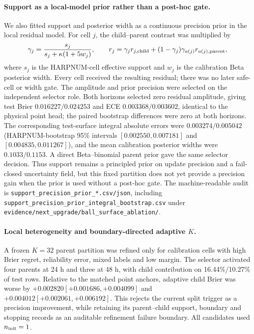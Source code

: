 \documentclass[11pt,a4paper]{article}
\numberwithin{equation}{section}
\theoremstyle{definition}\newtheorem{definition}[theorem]{Definition}
\theoremstyle{remark}\newtheorem{remark}[theorem]{Remark}
\begin{document}
\paragraph{Support as a local-model prior rather than a post-hoc gate.}
We also fitted support and posterior width as a continuous precision prior in the local residual model. For cell $j$, the child--parent contrast was multiplied by
\[
\gamma_j={s_j\over s_j+\kappa(1+5w_j)},
\qquad
r_j=\gamma_j r_{j,\mathrm{child}}+(1-\gamma_j)\gamma_{a(j)}r_{a(j),\mathrm{parent}},
\]
where $s_j$ is the HARPNUM-cell effective support and $w_j$ is the calibration Beta posterior width. Every cell received the resulting residual; there was no later safe-cell or width gate. The amplitude and prior precision were selected on the independent selector role. Both horizons selected zero residual amplitude, giving test Brier $0.016227/0.024253$ and ECE $0.003368/0.003602$, identical to the physical point head; the paired bootstrap differences were zero at both horizons. The corresponding test-surface integral absolute errors were $0.003274/0.005042$ (HARPNUM-bootstrap 95\% intervals $[0.002550,0.007181]$ and $[0.004835,0.011267]$), and the mean calibration posterior widths were $0.1033/0.1153$. A direct Beta--binomial parent prior gave the same selector decision. Thus support remains a principled prior on update precision and a fail-closed uncertainty field, but this fixed partition does not yet provide a precision gain when the prior is used without a post-hoc gate. The machine-readable audit is \texttt{support\_precision\_prior\_*.csv/json}, including \texttt{support\_precision\_prior\_integral\_bootstrap.csv} under \texttt{evidence/next\_upgrade/ball\_surface\_ablation/}.

\paragraph{Local heterogeneity and boundary-directed adaptive $K$.}
A frozen $K=32$ parent partition was refined only for calibration cells with high Brier regret, reliability error, mixed labels and low margin. The selector activated four parents at 24 h and three at 48 h, with child contribution on 16.44\%/10.27\% of test rows. Relative to the matched point anchors, adaptive child Brier was worse by $+0.002820[+0.001686,+0.004099]$ and $+0.004012[+0.002061,+0.006192]$. This rejects the current split trigger as a precision improvement, while retaining its parent--child support, boundary and stopping records as an auditable refinement failure boundary. All candidates used $n_{\rm init}=1$.
\end{document}
